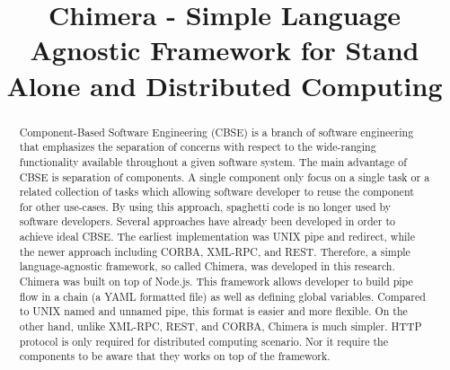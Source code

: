 \documentclass[conference]{IEEEtran}
\begin{document}

\title{Chimera - Simple Language Agnostic Framework for Stand Alone and Distributed Computing}

\author{
\and
{}
\and
{}
}

\maketitle


\begin{abstract}
Component-Based Software Engineering (CBSE) is a branch of software 
engineering that emphasizes the separation of concerns with respect to the 
wide-ranging functionality available throughout a given software system.  The 
main advantage of CBSE is separation of components. A single component  
only focus on a single task or a related collection of tasks which allowing software 
developer to reuse the component for other use-cases. By using this approach, 
spaghetti code is no longer used by software developers. Several 
approaches have already been developed in order to achieve ideal CBSE. The earliest 
implementation was UNIX pipe and redirect, while the newer approach including 
CORBA, XML-RPC, and REST. Therefore, a simple language-agnostic framework, 
so called Chimera, was developed in this research. Chimera was built on top of Node.js. 
This framework allows developer to build pipe flow in a chain (a YAML formatted file) 
as well as defining global variables. Compared to UNIX named and unnamed pipe, 
this format is easier and more flexible. On the other hand, unlike XML-RPC, 
REST, and CORBA, Chimera is much simpler. HTTP protocol is only required for
distributed computing scenario. Nor it require the components to be aware that 
they works on top of the framework.
\end{abstract}
\end{document}
